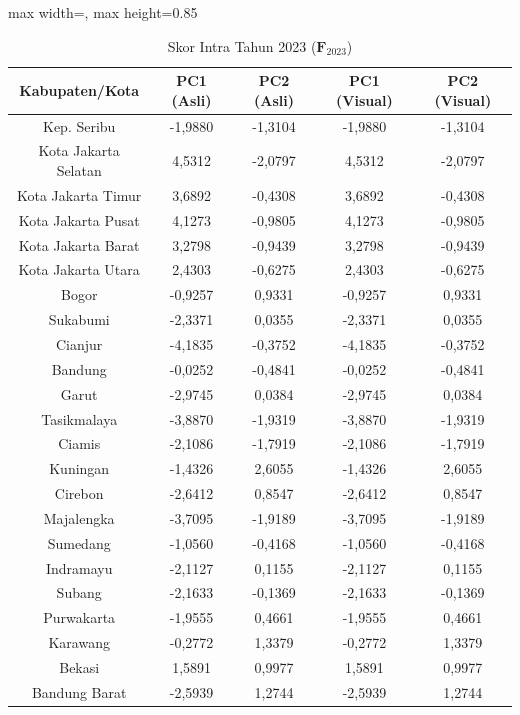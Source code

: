 \begin{table}[H]
\centering
\caption{Skor Intra Tahun 2023 ($\mathbf{F}_{2023}$)} \label{tab:app1skor_intra_2023}
\begin{adjustbox}{max width=\textwidth, max height=0.85\textheight}
\begin{tabular}{|c|c|c|c|c|}
\hline
\textbf{Kabupaten/Kota} & \textbf{PC1 (Asli)} & \textbf{PC2 (Asli)} & \textbf{PC1 (Visual)} & \textbf{PC2 (Visual)} \\
\hline
Kep. Seribu & -1,9880 & -1,3104 & -1,9880 & -1,3104 \\
Kota Jakarta Selatan & 4,5312 & -2,0797 & 4,5312 & -2,0797 \\
Kota Jakarta Timur & 3,6892 & -0,4308 & 3,6892 & -0,4308 \\
Kota Jakarta Pusat & 4,1273 & -0,9805 & 4,1273 & -0,9805 \\
Kota Jakarta Barat & 3,2798 & -0,9439 & 3,2798 & -0,9439 \\
Kota Jakarta Utara & 2,4303 & -0,6275 & 2,4303 & -0,6275 \\
Bogor & -0,9257 & 0,9331 & -0,9257 & 0,9331 \\
Sukabumi & -2,3371 & 0,0355 & -2,3371 & 0,0355 \\
Cianjur & -4,1835 & -0,3752 & -4,1835 & -0,3752 \\
Bandung & -0,0252 & -0,4841 & -0,0252 & -0,4841 \\
Garut & -2,9745 & 0,0384 & -2,9745 & 0,0384 \\
Tasikmalaya & -3,8870 & -1,9319 & -3,8870 & -1,9319 \\
Ciamis & -2,1086 & -1,7919 & -2,1086 & -1,7919 \\
Kuningan & -1,4326 & 2,6055 & -1,4326 & 2,6055 \\
Cirebon & -2,6412 & 0,8547 & -2,6412 & 0,8547 \\
Majalengka & -3,7095 & -1,9189 & -3,7095 & -1,9189 \\
Sumedang & -1,0560 & -0,4168 & -1,0560 & -0,4168 \\
Indramayu & -2,1127 & 0,1155 & -2,1127 & 0,1155 \\
Subang & -2,1633 & -0,1369 & -2,1633 & -0,1369 \\
Purwakarta & -1,9555 & 0,4661 & -1,9555 & 0,4661 \\
Karawang & -0,2772 & 1,3379 & -0,2772 & 1,3379 \\
Bekasi & 1,5891 & 0,9977 & 1,5891 & 0,9977 \\
Bandung Barat & -2,5939 & 1,2744 & -2,5939 & 1,2744 \\

\end{tabular}
\end{adjustbox}
\end{table}
